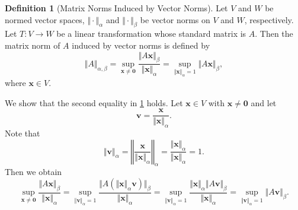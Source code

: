 \documentclass[12pt]{article}
\theoremstyle{definition}
\newtheorem{definition}[theorem]{Definition}
\begin{document}
\begin{definition}[Matrix Norms Induced by Vector Norms] \label{def:induced_matrix_norms}
    Let $V$ and $W$ be normed vector spaces, $\Vert\cdot\Vert_{\alpha}$ and $\Vert\cdot\Vert_{\beta}$ be vector norms on $V$ and $W$, respectively. Let $T:V\to W$ be a linear transformation whose standard matrix is $A$. Then the matrix norm of $A$ induced by vector norms is defined by
    \[ \Vert A\Vert_{\alpha,\beta} 
    = \sup_{\mathbf{x}\neq\mathbf{0}} \frac{\Vert A\mathbf{x}\Vert_\beta}{\Vert\mathbf{x}\Vert_\alpha}
    = \sup_{\Vert\mathbf{x}\Vert_\alpha = 1} \Vert A\mathbf{x}\Vert_\beta,
    \]
    where $\mathbf{x}\in V$.
\end{definition}

We show that the second equality in \ref{def:induced_matrix_norms} holds. Let $\mathbf{x}\in V$ with $\mathbf{x}\neq\mathbf{0}$ and let
\[ \mathbf{v} = \frac{\mathbf{x}}{\Vert\mathbf{x}\Vert_\alpha}. \]
Note that
\[ \Vert\mathbf{v}\Vert_\alpha
= \left\Vert \frac{\mathbf{x}}{\Vert\mathbf{x}\Vert_\alpha} \right\Vert_\alpha
= \frac{\Vert\mathbf{x}\Vert_\alpha}{\Vert\mathbf{x}\Vert_\alpha}
= 1.
\]
Then we obtain
\[ \sup_{\mathbf{x}\neq\mathbf{0}} \frac{\Vert A\mathbf{x}\Vert_\beta}{\Vert\mathbf{x}\Vert_\alpha}
= \sup_{\Vert\mathbf{v}\Vert_\alpha = 1} \frac{\Vert A(\Vert\mathbf{x}\Vert_\alpha \mathbf{v})\Vert_\beta}{\Vert\mathbf{x}\Vert_\alpha}
= \sup_{\Vert\mathbf{v}\Vert_\alpha = 1} \frac{\Vert\mathbf{x}\Vert_\alpha \Vert A\mathbf{v}\Vert_\beta}{\Vert\mathbf{x}\Vert_\alpha}
= \sup_{\Vert\mathbf{v}\Vert_\alpha = 1} \Vert A\mathbf{v}\Vert_\beta
.
\]
\end{document}
